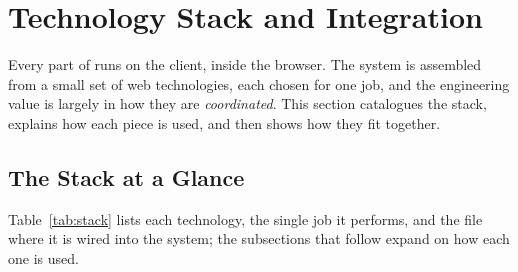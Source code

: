 \section{Technology Stack and Integration}
\label{sec:tech}

Every part of \proj{} runs on the client, inside the browser. The system is
assembled from a small set of web technologies, each chosen for one job, and the
engineering value is largely in how they are \emph{coordinated}. This section
catalogues the stack, explains how each piece is used, and then shows how they
fit together.

\subsection{The Stack at a Glance}
Table~\ref{tab:stack} lists each technology, the single job it performs, and the
file where it is wired into the system; the subsections that follow expand on how
each one is used.

